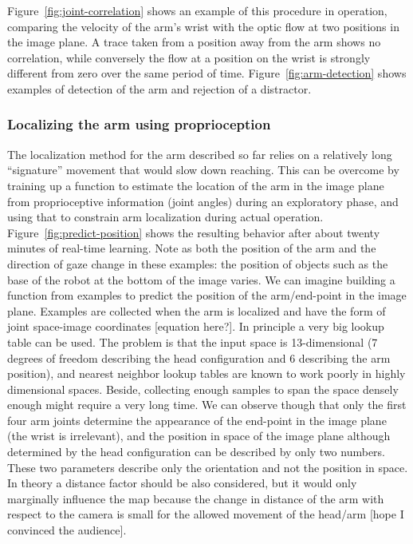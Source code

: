 Figure~\ref{fig:joint-correlation} shows an example of this procedure
in operation, comparing the velocity of the arm's wrist with the optic
flow at two positions in the image plane.  A trace taken from a
position away from the arm shows no correlation, while conversely the
flow at a position on the wrist is strongly different from zero over
the same period of time.  Figure~\ref{fig:arm-detection} shows
examples of detection of the arm and rejection of a distractor.


\subsubsection*{Localizing the arm using proprioception}

The localization method for the arm described so far relies on a
relatively long ``signature'' movement that would slow down reaching.
This can be overcome by training up a function to estimate the
location of the arm in the image plane from proprioceptive information
(joint angles) during an exploratory phase, and using that to 
constrain arm localization during actual operation.
Figure~\ref{fig:predict-position} shows the resulting behavior
after about twenty minutes of real-time learning. 
%
\ifverbose
Note as both the
position of the arm and the direction of gaze change in these
examples: the position of objects such as the base of the robot at the
bottom of the image varies.
\fi
%
\ifverbose
We can imagine building a function from examples to predict the
position of the arm/end-point in the image plane. Examples are
collected when the arm is localized and have the form of joint
space-image coordinates [equation here?]. In principle a very big
lookup table can be used. The problem is that the input space is
13-dimensional (7 degrees of freedom describing the head configuration
and 6 describing the arm position), and nearest neighbor lookup tables
are known to work poorly in highly dimensional spaces. Beside,
collecting enough samples to span the space densely enough might
require a very long time. We can observe though that only the first
four arm joints determine the appearance of the end-point in the image
plane (the wrist is irrelevant), and the position in space of the
image plane although determined by the head configuration can be
described by only two numbers. These two parameters describe only the
orientation and not the position in space. In theory a distance factor
should be also considered, but it would only marginally influence the
map because the change in distance of the arm with respect to the
camera is small for the allowed movement of the head/arm [hope I
convinced the audience].
\fi


